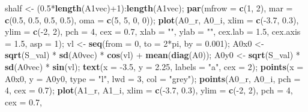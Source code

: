 \documentclass[]{article}
\newenvironment{Shaded}{\begin{snugshade}}{\end{snugshade}}
\newcommand{\KeywordTok}[1]{\textcolor[rgb]{0.13,0.29,0.53}{\textbf{{#1}}}}
\newcommand{\DataTypeTok}[1]{\textcolor[rgb]{0.13,0.29,0.53}{{#1}}}
\newcommand{\DecValTok}[1]{\textcolor[rgb]{0.00,0.00,0.81}{{#1}}}
\newcommand{\FloatTok}[1]{\textcolor[rgb]{0.00,0.00,0.81}{{#1}}}
\newcommand{\StringTok}[1]{\textcolor[rgb]{0.31,0.60,0.02}{{#1}}}
\newcommand{\NormalTok}[1]{{#1}}
\begin{document}
\begin{Shaded}
\begin{Highlighting}[]
    \NormalTok{shalf       <-}\StringTok{ }\NormalTok{(}\FloatTok{0.5}\NormalTok{*}\KeywordTok{length}\NormalTok{(A1vec)+}\DecValTok{1}\NormalTok{):}\KeywordTok{length}\NormalTok{(A1vec);}
    \KeywordTok{par}\NormalTok{(}\DataTypeTok{mfrow =} \KeywordTok{c}\NormalTok{(}\DecValTok{1}\NormalTok{, }\DecValTok{2}\NormalTok{), }\DataTypeTok{mar =} \KeywordTok{c}\NormalTok{(}\FloatTok{0.5}\NormalTok{, }\FloatTok{0.5}\NormalTok{, }\FloatTok{0.5}\NormalTok{, }\FloatTok{0.5}\NormalTok{), }\DataTypeTok{oma =} \KeywordTok{c}\NormalTok{(}\DecValTok{5}\NormalTok{, }\DecValTok{5}\NormalTok{, }\DecValTok{0}\NormalTok{, }\DecValTok{0}\NormalTok{));}
    \KeywordTok{plot}\NormalTok{(A0_r, A0_i, }\DataTypeTok{xlim =} \KeywordTok{c}\NormalTok{(-}\FloatTok{3.7}\NormalTok{, }\FloatTok{0.3}\NormalTok{), }\DataTypeTok{ylim =} \KeywordTok{c}\NormalTok{(-}\DecValTok{2}\NormalTok{, }\DecValTok{2}\NormalTok{), }\DataTypeTok{pch =} \DecValTok{4}\NormalTok{, }\DataTypeTok{cex =} \FloatTok{0.7}\NormalTok{,}
         \DataTypeTok{xlab =} \StringTok{""}\NormalTok{, }\DataTypeTok{ylab =} \StringTok{""}\NormalTok{, }\DataTypeTok{cex.lab =} \FloatTok{1.5}\NormalTok{, }\DataTypeTok{cex.axis =} \FloatTok{1.5}\NormalTok{, }\DataTypeTok{asp =} \DecValTok{1}\NormalTok{);}
    \NormalTok{vl   <-}\StringTok{ }\KeywordTok{seq}\NormalTok{(}\DataTypeTok{from =} \DecValTok{0}\NormalTok{, }\DataTypeTok{to =} \DecValTok{2}\NormalTok{*pi, }\DataTypeTok{by =} \FloatTok{0.001}\NormalTok{);}
    \NormalTok{A0x0 <-}\StringTok{ }\KeywordTok{sqrt}\NormalTok{(S_val) *}\StringTok{ }\KeywordTok{sd}\NormalTok{(A0vec) *}\StringTok{ }\KeywordTok{cos}\NormalTok{(vl) +}\StringTok{ }\KeywordTok{mean}\NormalTok{(}\KeywordTok{diag}\NormalTok{(A0));}
    \NormalTok{A0y0 <-}\StringTok{ }\KeywordTok{sqrt}\NormalTok{(S_val) *}\StringTok{ }\KeywordTok{sd}\NormalTok{(A0vec) *}\StringTok{ }\KeywordTok{sin}\NormalTok{(vl);}
    \KeywordTok{text}\NormalTok{(}\DataTypeTok{x =} \NormalTok{-}\FloatTok{3.5}\NormalTok{, }\DataTypeTok{y =} \FloatTok{2.25}\NormalTok{, }\DataTypeTok{labels =} \StringTok{"a"}\NormalTok{, }\DataTypeTok{cex =} \DecValTok{2}\NormalTok{);}
    \KeywordTok{points}\NormalTok{(}\DataTypeTok{x =} \NormalTok{A0x0, }\DataTypeTok{y =} \NormalTok{A0y0, }\DataTypeTok{type =} \StringTok{"l"}\NormalTok{, }\DataTypeTok{lwd =} \DecValTok{3}\NormalTok{, }\DataTypeTok{col =} \StringTok{"grey"}\NormalTok{);}
    \KeywordTok{points}\NormalTok{(A0_r, A0_i, }\DataTypeTok{pch =} \DecValTok{4}\NormalTok{, }\DataTypeTok{cex =} \FloatTok{0.7}\NormalTok{);}
    \KeywordTok{plot}\NormalTok{(A1_r, A1_i, }\DataTypeTok{xlim =} \KeywordTok{c}\NormalTok{(-}\FloatTok{3.7}\NormalTok{, }\FloatTok{0.3}\NormalTok{), }\DataTypeTok{ylim =} \KeywordTok{c}\NormalTok{(-}\DecValTok{2}\NormalTok{, }\DecValTok{2}\NormalTok{), }\DataTypeTok{pch =} \DecValTok{4}\NormalTok{, }\DataTypeTok{cex =} \FloatTok{0.7}\NormalTok{,}

\end{Highlighting}
\end{Shaded}
\end{document}
